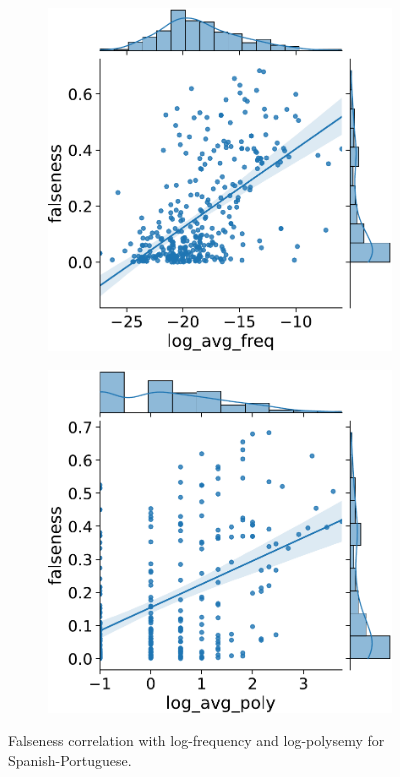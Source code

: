 \documentclass[output=paper]{langsci/langscibook}
\begin{document}
\begin{figure}[p]
    \begin{subfigure}{0.5\textwidth}\centering
    \includegraphics[width=\linewidth]{figures/UBAN_correlation_es_pt_falseness_logfreq_big.pdf}
    \end{subfigure}\begin{subfigure}{0.5\textwidth}\centering
    \includegraphics[width=\linewidth]{figures/UBAN_correlation_es_pt_falseness_logpoly_big.pdf}
    \end{subfigure}
\caption{Falseness correlation with log-frequency and log-polysemy for Spanish-Portuguese.\label{fig:scatter2}}
\end{figure}\clearpage
\end{document}
